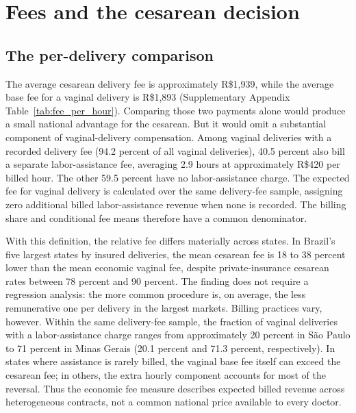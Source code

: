 \documentclass[12pt]{article}
\newcommand{\satab}[1]{Supplementary Appendix Table~\ref{#1}}
\begin{document}
\section{Fees and the cesarean decision}\label{sec:notprice}

\subsection{The per-delivery comparison}\label{sec:per_delivery}

The average cesarean delivery fee is approximately R\$1,939, while the average base fee for a vaginal delivery is R\$1,893 (\satab{tab:fee_per_hour}). Comparing those two payments alone would produce a small national advantage for the cesarean. But it would omit a substantial component of vaginal-delivery compensation. Among vaginal deliveries with a recorded delivery fee (94.2 percent of all vaginal deliveries), 40.5 percent also bill a separate labor-assistance fee, averaging 2.9 hours at approximately R\$420 per billed hour. The other 59.5 percent have no labor-assistance charge. The expected fee for vaginal delivery is calculated over the same delivery-fee sample, assigning zero additional billed labor-assistance revenue when none is recorded. The billing share and conditional fee means therefore have a common denominator.

With this definition, the relative fee differs materially across states. In Brazil's five largest states by insured deliveries, the mean cesarean fee is 18 to 38 percent lower than the mean economic vaginal fee, despite private-insurance cesarean rates between 78 percent and 90 percent. The finding does not require a regression analysis: the more common procedure is, on average, the less remunerative one per delivery in the largest markets. Billing practices vary, however. Within the same delivery-fee sample, the fraction of vaginal deliveries with a labor-assistance charge ranges from approximately 20 percent in São Paulo to 71 percent in Minas Gerais (20.1 percent and 71.3 percent, respectively). In states where assistance is rarely billed, the vaginal base fee itself can exceed the cesarean fee; in others, the extra hourly component accounts for most of the reversal. Thus the economic fee measure describes expected billed revenue across heterogeneous contracts, not a common national price available to every doctor.
\end{document}
